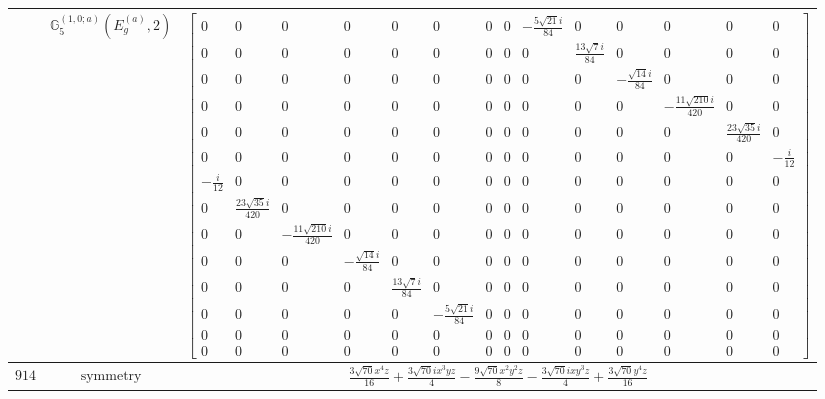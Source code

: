 \documentclass[fleqn,8pt,landscape]{jsarticle}
\begin{document}
\begin{longtable}{ccc}
$  $ & $ \mathbb{G}_{5}^{(1,0;a)}(E_{g}^{(a)},2) $ & $ \begin{bmatrix} 0 & 0 & 0 & 0 & 0 & 0 & 0 & 0 & - \frac{5 \sqrt{21} i}{84} & 0 & 0 & 0 & 0 & 0 \\ 0 & 0 & 0 & 0 & 0 & 0 & 0 & 0 & 0 & \frac{13 \sqrt{7} i}{84} & 0 & 0 & 0 & 0 \\ 0 & 0 & 0 & 0 & 0 & 0 & 0 & 0 & 0 & 0 & - \frac{\sqrt{14} i}{84} & 0 & 0 & 0 \\ 0 & 0 & 0 & 0 & 0 & 0 & 0 & 0 & 0 & 0 & 0 & - \frac{11 \sqrt{210} i}{420} & 0 & 0 \\ 0 & 0 & 0 & 0 & 0 & 0 & 0 & 0 & 0 & 0 & 0 & 0 & \frac{23 \sqrt{35} i}{420} & 0 \\ 0 & 0 & 0 & 0 & 0 & 0 & 0 & 0 & 0 & 0 & 0 & 0 & 0 & - \frac{i}{12} \\ - \frac{i}{12} & 0 & 0 & 0 & 0 & 0 & 0 & 0 & 0 & 0 & 0 & 0 & 0 & 0 \\ 0 & \frac{23 \sqrt{35} i}{420} & 0 & 0 & 0 & 0 & 0 & 0 & 0 & 0 & 0 & 0 & 0 & 0 \\ 0 & 0 & - \frac{11 \sqrt{210} i}{420} & 0 & 0 & 0 & 0 & 0 & 0 & 0 & 0 & 0 & 0 & 0 \\ 0 & 0 & 0 & - \frac{\sqrt{14} i}{84} & 0 & 0 & 0 & 0 & 0 & 0 & 0 & 0 & 0 & 0 \\ 0 & 0 & 0 & 0 & \frac{13 \sqrt{7} i}{84} & 0 & 0 & 0 & 0 & 0 & 0 & 0 & 0 & 0 \\ 0 & 0 & 0 & 0 & 0 & - \frac{5 \sqrt{21} i}{84} & 0 & 0 & 0 & 0 & 0 & 0 & 0 & 0 \\ 0 & 0 & 0 & 0 & 0 & 0 & 0 & 0 & 0 & 0 & 0 & 0 & 0 & 0 \\ 0 & 0 & 0 & 0 & 0 & 0 & 0 & 0 & 0 & 0 & 0 & 0 & 0 & 0 \end{bmatrix} $ \\ \hline
$ 914 $ & $ \text{symmetry} $ & $ \frac{3 \sqrt{70} x^{4} z}{16} + \frac{3 \sqrt{70} i x^{3} y z}{4} - \frac{9 \sqrt{70} x^{2} y^{2} z}{8} - \frac{3 \sqrt{70} i x y^{3} z}{4} + \frac{3 \sqrt{70} y^{4} z}{16} $ \\

\end{longtable}
\end{document}
